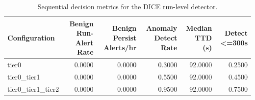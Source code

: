 \begin{table}[t]
\centering
\caption{Sequential decision metrics for the DICE run-level detector.}
\label{tab:dice_sequential_metrics}
\footnotesize
\begin{tabular}{lrrrrr}
\toprule
Configuration & Benign Run-Alert Rate & Benign Persist Alerts/hr & Anomaly Detect Rate & Median TTD (s) & Detect <=300s \\
\midrule
tier0 & 0.0000 & 0.0000 & 0.3000 & 92.0000 & 0.2500 \\
tier0_tier1 & 0.0000 & 0.0000 & 0.5500 & 92.0000 & 0.4500 \\
tier0_tier1_tier2 & 0.0000 & 0.0000 & 0.9500 & 92.0000 & 0.7500 \\
\bottomrule
\end{tabular}

\end{table}
